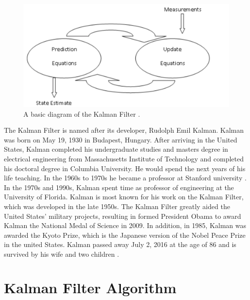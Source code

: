 \newpage

\begin{figure}[h]
    \centering
    \includegraphics[scale = 0.3]{diagram.png}
    \caption{A basic diagram of the Kalman Filter \cite{kohanbash_2014}.}
    \label{coffee}
\end{figure}

\newpage

\noindent The Kalman Filter is named after its developer, Rudolph Emil Kalman. Kalman was born on May 19, 1930 in Budapest, Hungary. After arriving in the United States, Kalman completed his undergraduate studies and masters degree in electrical engineering from Massachusetts Institute of Technology  and completed his doctoral degree in Columbia University. He would spend the next years of his life teaching. In the 1960s to 1970s he became a professor at Stanford university \cite{kalmanbio}. In the 1970s and 1990s, Kalman spent time as professor of  engineering at the University of Florida. Kalman is most known for his work on the Kalman Filter, which was developed in the late 1950s. The Kalman Filter greatly aided the United States' military projects, resulting in formed President Obama to award Kalman the National Medal of Science in 2009. In addition, in 1985, Kalman was awarded the Kyoto Prize, which is the Japanese version of the Nobel Peace Prize in the united States. Kalman passed away July 2, 2016 at the age of 86 and is survived by his wife and two children \cite{Kalman_bio}. 


\newpage

\section{Kalman Filter Algorithm}

